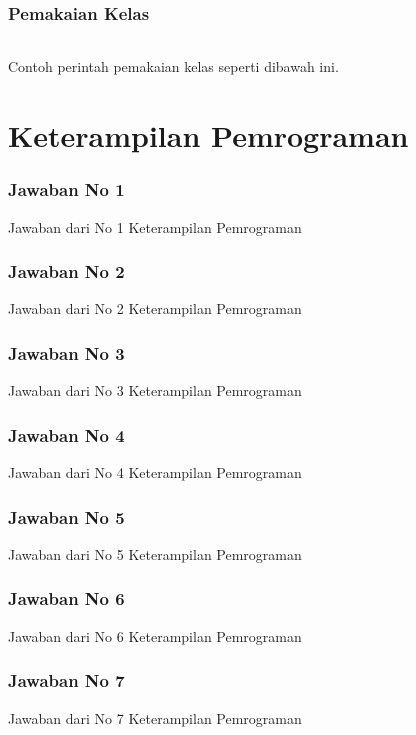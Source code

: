 \documentclass{article}
\begin{document}
\section{Pemakaian Kelas}
\paragraph{}
Contoh perintah pemakaian kelas seperti dibawah ini.


\newpage
\part{Keterampilan Pemrograman}
\section{Jawaban No 1}
Jawaban dari No 1 Keterampilan Pemrograman

\section{Jawaban No 2}
Jawaban dari No 2 Keterampilan Pemrograman

\section{Jawaban No 3}
Jawaban dari No 3 Keterampilan Pemrograman


\newpage
\section{Jawaban No 4}
Jawaban dari No 4 Keterampilan Pemrograman

\section{Jawaban No 5}
Jawaban dari No 5 Keterampilan Pemrograman

\section{Jawaban No 6}
Jawaban dari No 6 Keterampilan Pemrograman


\newpage
\section{Jawaban No 7}
Jawaban dari No 7 Keterampilan Pemrograman

\end{document}

